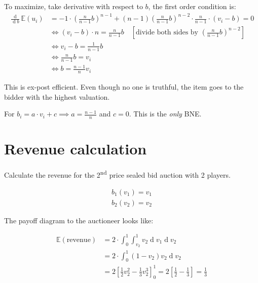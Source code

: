 \documentclass{article}
\renewcommand{\d}[1]{\ensuremath{\operatorname{d}\!{#1}}}
\begin{document}
\noindent
To maximize, take derivative with respect to $b$, the first order condition is:
\begin{equation*}
    \begin{aligned}
        \frac{\operatorname{d}}{\d b}\mathbb{E}(u_i)&=-1 \cdot \left( \frac{n}{n-1}b \right)^{n-1}+(n-1) \left( \frac{n}{n-1}b \right)^{n-2} \cdot \frac{n}{n-1} \cdot (v_i-b)=0\\
        &\iff (v_i-b)\cdot n=\frac{n}{n-1}b
        \quad{\left[\text{divide both sides by }\left(\frac{n}{n-1}b\right)^{n-2}\right]}\\
        &\iff v_i-b=\frac{1}{n-1}b\\
        &\iff\frac{n}{n-1}b=v_i\\
        &\iff b=\frac{n-1}{n}v_i
    \end{aligned}
\end{equation*}

\noindent
This is ex-post efficient. Even though no one is truthful, the item goes to the bidder with the highest valuation.

\noindent
For $b_i=a\cdot v_i+c\implies a=\frac{n-1}{n}$ and $c=0$. This is the \textit{only} BNE.

\section*{Revenue calculation}
Calculate the revenue for the 2\textsuperscript{nd} price sealed bid auction with 2 players.

\begin{equation*}
\begin{aligned}
    b_1(v_1)=v_1\\
    b_2(v_2)=v_2
\end{aligned}
\end{equation*}

\noindent
The payoff diagram to the auctioneer looks like:
\begin{center}
\end{center}

\begin{equation*}
    \begin{aligned}
        \mathbb{E}(\text{revenue})&=2\cdot\int_0^1\int_{v_2}^1 v_2 \d v_1 \d v_2\\
        &=2\cdot\int_0^1(1-v_2)v_2\d v_2\\
        &=2\left[\frac{1}{2}v_2^2-\frac{1}{3}v_2^3\right]_0^1=2\left[\frac{1}{2}-\frac{1}{3}\right]=\frac{1}{3}
    \end{aligned}
\end{equation*}
\end{document}
